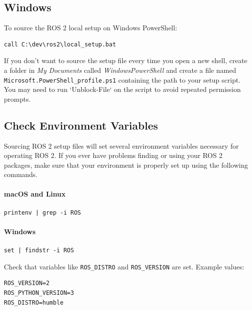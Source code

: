 \subsection{Windows}

To source the ROS 2 local setup on Windows PowerShell:

\begin{verbatim}
call C:\dev\ros2\local_setup.bat
\end{verbatim}

If you don't want to source the setup file every time you open a new shell, create a folder in 
\textit{My Documents} called \textit{WindowsPowerShell} and create a file named \texttt{Microsoft.PowerShell\_profile.ps1} containing the path to your setup script. You may need to run `Unblock-File` on the script to avoid repeated permission prompts.


\subsection{Check Environment Variables}

Sourcing ROS 2 setup files will set several environment variables necessary for operating ROS 2. If you ever have problems finding or using your ROS 2 packages, make sure that your environment is properly set up using the following commands.

\paragraph{macOS and Linux}
\begin{verbatim}
printenv | grep -i ROS
\end{verbatim}

\paragraph{Windows}
\begin{verbatim}
set | findstr -i ROS
\end{verbatim}

Check that variables like \texttt{ROS\_DISTRO} and \texttt{ROS\_VERSION} are set. Example values:

\begin{verbatim}
ROS_VERSION=2
ROS_PYTHON_VERSION=3
ROS_DISTRO=humble
\end{verbatim}

